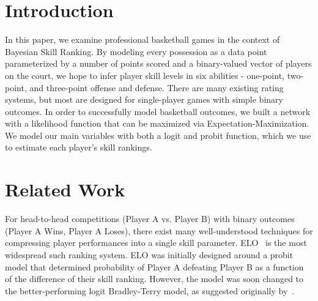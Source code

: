 \documentclass[10pt,twocolumn]{article}
\begin{document}


\section{Introduction}

	In this paper, we examine professional basketball games in the context of Bayesian Skill Ranking. By modeling every possession as a data point parameterized by a number of points scored and a binary-valued vector of players on the court, we hope to infer player skill levels in six abilities - one-point, two-point, and three-point offense and defense. There are many existing rating systems, but most are designed for single-player games with simple binary outcomes. In order to successfully model basketball outcomes, we built a network with a likelihood function that can be maximized via Expectation-Maximization. We model our main variables with both a logit and probit function, which we use to estimate each player's skill rankings.


\section{Related Work}

For head-to-head competitions (Player A vs. Player B) with binary outcomes (Player A Wins, Player A Loses), there exist many well-understood techniques for compressing player performances into a single skill parameter.
ELO~\cite{elo1978rating} is the most widespread such ranking system.
ELO was initially designed around a probit model that determined probability of Player A defeating Player B as a function of the difference of their skill ranking. However, the model was soon changed to the better-performing logit Bradley-Terry model, as suggested originally by~\cite{bradley1952rank}.
\end{document}
